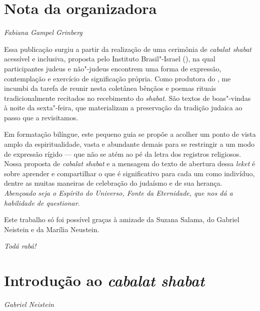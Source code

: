 

\chapter*{Nota da organizadora}


\begin{flushright}
\emph{Fabiana Gampel Grinberg}
\end{flushright}


Essa publicação surgiu a partir da realização de uma cerimônia de \emph{cabalat shabat} acessível e inclusiva, proposta pelo Instituto Brasil"-Israel (), na qual participantes judeus e não"-judeus encontrem uma forma de expressão, contemplação e exercício de significação própria. Como produtora do , me incumbi da tarefa de reunir nesta coletânea bênçãos e poemas rituais tradicionalmente recitados no recebimento do \emph{shabat}. São textos de boas"-vindas à noite da sexta"-feira, que materializam a preservação da tradição judaica ao passo que a revisitamos.

Em formatação bilíngue, este pequeno guia se propõe a acolher um ponto de vista amplo da espiritualidade, vasta e abundante demais para se restringir a um modo de expressão rígido --- que não se atém ao pé da letra dos registros religiosos. Nossa proposta de \emph{cabalat shabat} e a mensagem do texto de abertura dessa \emph{leket} é sobre aprender e compartilhar o que é significativo para cada um como indivíduo, dentre as muitas maneiras de celebração do judaísmo e de sua herança. \emph{Abençoado seja o Espírito do Universo, Fonte da Eternidade, que nos dá a habilidade de questionar}.

Este trabalho só foi possível graças à amizade da Suzana Salama, do Gabriel Neistein e da Marília Neustein.

\emph{Todá rabá!}


\chapter*{Introdução ao \emph{cabalat shabat}}


\begin{flushright}
\emph{Gabriel Neistein}
\end{flushright}

